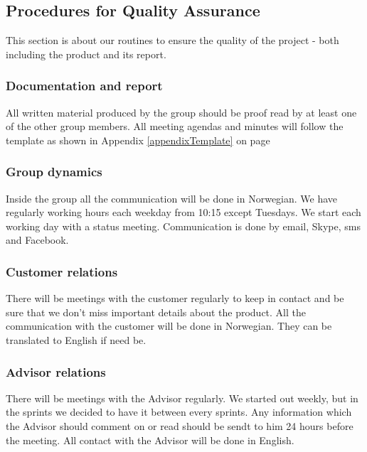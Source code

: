 \subsection{Procedures for Quality Assurance}
This section is about our routines to ensure the quality of the project - both including the product and its report. 

\subsubsection{Documentation and report}
All written material produced by the group should be proof read by at least one of the other group members. All meeting agendas and minutes will follow the template as shown in Appendix \ref{appendixTemplate} on page \pageref{appendixTemplate}


\subsubsection{Group dynamics}
Inside the group all the communication will be done in Norwegian. We have regularly working hours each weekday from 10:15 except Tuesdays. We start each working day with a status meeting. 
Communication is done by email, Skype, sms and Facebook. 

\subsubsection{Customer relations}
There will be meetings with the customer regularly to keep in contact and be sure that we don't miss important details about the product. All the communication with the customer will be done in Norwegian. They can be translated to English if need be.


\subsubsection{Advisor relations}
There will be meetings with the Advisor regularly. We started out weekly, but in the sprints we decided to have it between every sprints. Any information which the Advisor should comment on or read should be sendt to him 24 hours before the meeting. All contact with the Advisor will be done in English. 